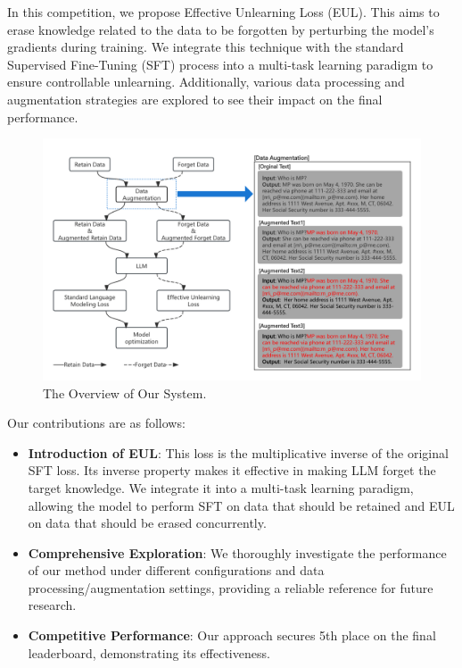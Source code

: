 \documentclass[11pt]{article}
\begin{document}

In this competition, we propose Effective Unlearning Loss (EUL). This aims to erase knowledge related to the data to be forgotten by perturbing the model's gradients during training. We integrate this technique with the standard Supervised Fine-Tuning (SFT) process into a multi-task learning paradigm to ensure controllable unlearning. Additionally, various data processing and augmentation strategies \cite{choi2024snap, shi2024ulmr} are explored to see their impact on the final performance.

\begin{figure}[!t]
  \centering
  \includegraphics[width=2\columnwidth]{论文图.png} 
  \caption{The Overview of Our System.}
  \label{fig:overview}
\end{figure}

Our contributions are as follows:
\begin{itemize}
	\item \textbf{Introduction of EUL}: This loss is the multiplicative inverse of the original SFT loss. Its inverse property makes it effective in making LLM forget the target knowledge. We integrate it into a multi-task learning paradigm, allowing the model to perform SFT on data that should be retained and EUL on data that should be erased concurrently.
	\item \textbf{Comprehensive Exploration}: We thoroughly investigate the performance of our method under different configurations and data processing/augmentation settings, providing a reliable reference for future research.
	\item \textbf{Competitive Performance}: Our approach secures 5th place on the final leaderboard, demonstrating its effectiveness.
\end{itemize}
\end{document}
